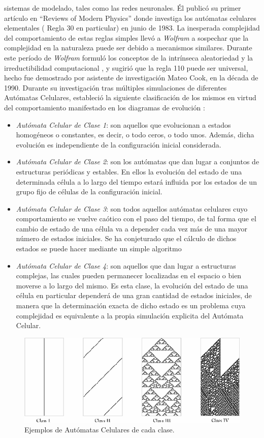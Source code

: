 sistemas de modelado, tales como las redes neuronales. Él publicó su primer artículo en ``Reviews of Modern Physics'' donde investiga los autómatas celulares elementales ( Regla 30 en particular) en junio de 1983. La inesperada complejidad del comportamiento de estas reglas simples llevó a \textit{Wolfram} a sospechar que la complejidad en la naturaleza puede ser debido a mecanismos similares. Durante este período de \textit{Wolfram} formuló los conceptos de la intrínseca aleatoriedad y la irreductibilidad computacional , y sugirió que la regla 110 puede ser universal, hecho fue demostrado por asistente de investigación Mateo Cook, en la década de 1990. Durante su investigación tras múltiples simulaciones de diferentes Autómatas Celulares, estableció la siguiente clasificación de los mismos en virtud del comportamiento manifestado en los diagramas de evolución \cite{wolfram}:
\begin{itemize}
\item \textit{Autómata Celular de Clase 1}: son aquellos que evolucionan a estados homogéneos o constantes, es decir, o todo ceros, o todo unos. Además, dicha evolución es independiente de la configuración inicial considerada.
\item \textit{Autómata Celular de Clase 2}: son los autómatas que dan lugar a conjuntos de estructuras periódicas y estables. En ellos la evolución del estado de una determinada célula a lo largo del tiempo estará influida por los estados de un grupo fijo de células de la configuración inicial.
\item \textit{Autómata Celular de Clase 3}: son todos aquellos autómatas celulares cuyo comportamiento se vuelve caótico con el paso del tiempo, de tal forma que el cambio de estado de una célula va a depender cada vez más de una mayor número de estados iniciales. Se ha conjeturado que el cálculo de dichos estados se puede hacer mediante un simple algoritmo
\item \textit{Autómata Celular de Clase 4}: son aquellos que dan lugar a estructuras complejas, las cuales pueden permanecer localizadas en el espacio o bien moverse a lo largo del mismo. Es esta clase, la evolución del estado de una célula en particular dependerá de una gran cantidad de estados iniciales, de manera que la determinación exacta de dicho estado es un problema cuya complejidad es equivalente a la propia simulación explicita del Autómata Celular.
\end{itemize}

\begin{figure}[H]
\centering
\includegraphics[scale=0.7]{imagenes/AutomatasCelulares_WolframClasses.png}
\caption{Ejemplos de Autómatas Celulares de cada clase.}
\label{fig:clase}
\end{figure}

